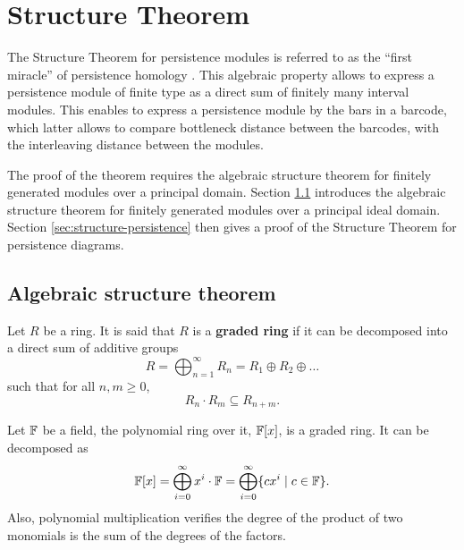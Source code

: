 \chapter{Structure Theorem} \label{chap:structure}
The Structure Theorem for persistence modules is referred to as the ``first miracle'' of persistence homology \cite{nanda}. This algebraic property allows to express a persistence module of finite type as a direct sum of finitely many interval modules. This enables to express a persistence module by the bars in a barcode, which latter allows to compare bottleneck distance between the barcodes, with the interleaving distance between the modules.

The proof of the theorem requires the algebraic structure theorem for finitely generated modules over a principal domain. Section \ref{sec:structure-algebraic} introduces the algebraic structure theorem for finitely generated modules over a principal ideal domain. Section \ref{sec:structure-persistence} then gives a proof of the Structure Theorem for persistence diagrams.

\section{Algebraic structure theorem} \label{sec:structure-algebraic}

\begin{definition}
    Let $ R $ be a ring. It is said that $ R $ is a {\bf graded ring} if it can be decomposed into a direct sum of additive groups
    \begin{equation}
        R = \bigoplus_{n=1}^{\infty} R_n = R_1 \oplus R_2 \oplus \dots
    \end{equation}
    such that for all $ n, m \geq 0 $, 
    \begin{equation}
        R_n \cdot R_m \subseteq R_{n+m}.
    \end{equation}
\end{definition}

\begin{example} \label{ex:graded-ring}
    Let $ \mathbb F $ be a field, the polynomial ring over it, $ \mathbb F[x] $, is a graded ring. It can be decomposed as
    \begin{equation}
        \mathbb F[x] = \bigoplus_{i=0}^\infty x^i \cdot \mathbb F = \bigoplus_{i=0}^\infty \{c x^i \mid c \in \mathbb F\}.
    \end{equation}
    Also, polynomial multiplication verifies the degree of the product of two monomials is the sum of the degrees of the factors.
\end{example}

